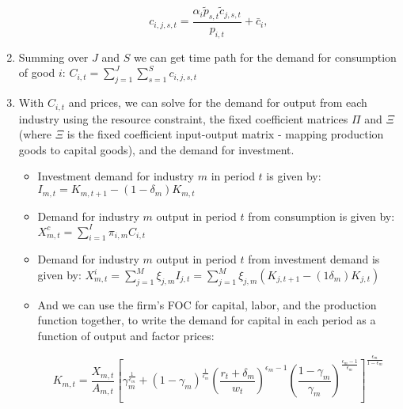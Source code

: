 \documentclass[letterpaper,12pt]{article}
\theoremstyle{definition}
\begin{document}
\begin{spacing}{1.5}
\begin{enumerate}
\begin{equation}
c_{i,j,s,t}  = \frac{\alpha_{i} \tilde{p}_{s,t}\tilde{c}_{j,s,t}}{p_{i,t}} + \bar{c}_{i},
\end{equation}

\item Summing over $J$ and $S$ we can get time path for the demand for consumption of good $i$: $C_{i,t} = \sum_{j=1}^{J}\sum_{s=1}^{S} c_{i,j,s,t}$
\item With $C_{i,t}$ and prices, we can solve for the demand for output from each industry using the resource constraint, the fixed coefficient matrices $\Pi$ and $\Xi$ (where $\Xi$ is the fixed coefficient input-output matrix - mapping production goods to capital goods), and the demand for investment.
	\begin{itemize}
	\item Investment demand for industry $m$ in period $t$ is given by: $I_{m,t} = K_{m,t+1} - (1 - \delta_{m})K_{m,t}$
	\item Demand for industry $m$ output in period $t$ from consumption is given by: $X^{c}_{m,t} = \sum_{i=1}^{I} \pi_{i,m}C_{i,t}$
	\item Demand for industry $m$ output in period $t$ from investment demand is given by: $X^{i}_{m,t} =  \sum_{j=1}^{M} \xi_{j,m}I_{j,t} = \sum_{j=1}^{M} \xi_{j,m}\left(K_{j,t+1} - (1\delta_{m})K_{j,t}\right) $
	\item And we can use the firm's FOC for capital, labor, and the production function together,  to write the demand for capital in each period as a function of output and factor prices: 
	
	\begin{equation}
	\label{eqn:k_demand2}
	K_{m,t} = \frac{X_{m,t}}{A_{m,t}}\left[\gamma_{m}^{\frac{1}{\epsilon_{m}}}+(1-\gamma_{m})^{\frac{1}{\epsilon_{m}}}\left(\frac{r_{t}+\delta_{m}}{w_{t}}\right)^{\epsilon_{m}-1}\left(\frac{1-\gamma_{m}}{\gamma_{m}}	\right)^{\frac{\epsilon_{m}-1}{\epsilon_{m}}}\right]^{\frac{\epsilon_{m}}{1-\epsilon_{m}}}
	\end{equation}
	

\end{itemize}
\end{enumerate}
\end{spacing}
\end{document}
